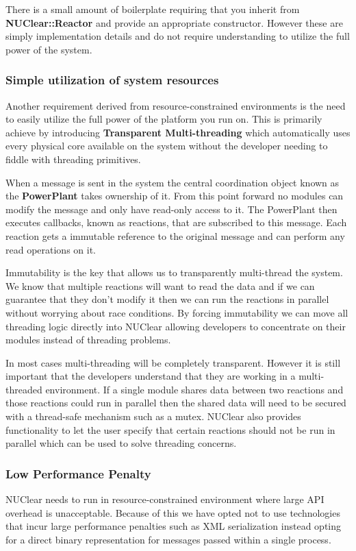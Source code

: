 \documentclass[english,12pt]{scrartcl}
\begin{document}
					There is a small amount of boilerplate requiring that you inherit from \textbf{NUClear::Reactor} and provide an appropriate constructor.
					However these are simply implementation details and do not require understanding to utilize the full power of the system.
			
			\subsubsection{Simple utilization of system resources}
				Another requirement derived from resource-constrained environments is the need to easily utilize the full power of the platform you run on.
				This is primarily achieve by introducing \textbf{Transparent Multi-threading} which automatically uses every physical core available on the system
				without the developer needing to fiddle with threading primitives.
				
				When a message is sent in the system the central coordination object known as the \textbf{PowerPlant} takes ownership of it. 
				From this point forward no modules can modify the message and only have read-only access to it.
				The PowerPlant then executes callbacks, known as reactions, that are subscribed to this message.
				Each reaction gets a immutable reference to the original message and can perform any read operations on it.
				
				Immutability is the key that allows us to transparently multi-thread the system.
				We know that multiple reactions will want to read the data and if we can guarantee that they don't modify it then we can
				run the reactions in parallel without worrying about race conditions.
				By forcing immutability we can move all threading logic directly into NUClear allowing developers to concentrate on their modules
				instead of threading problems.
				
				In most cases multi-threading will be completely transparent. 
				However it is still important that the developers understand that they are working in a multi-threaded environment.
				If a single module shares data between two reactions and those reactions could run in parallel then the shared data will
				need to be secured with a thread-safe mechanism such as a mutex.
				NUClear also provides functionality to let the user specify that certain reactions should not be run in parallel which can be used to solve threading concerns.
			
			\subsubsection{Low Performance Penalty}
				NUClear needs to run in resource-constrained environment where large API overhead is unacceptable.
				Because of this we have opted not to use technologies that incur large performance penalties such as XML serialization 
				instead opting for a direct binary representation for messages passed within a single process. 
				
\end{document}
